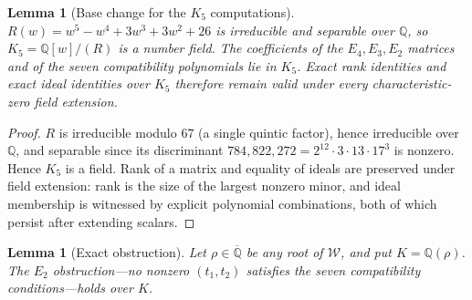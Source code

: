 \documentclass[a4paper,11pt]{article}
\theoremstyle{plain}
\newtheorem{lemma}[theorem]{Lemma}
\theoremstyle{definition}
\theoremstyle{remark}
\begin{document}
\begin{lemma}[Base change for the $K_5$ computations]\label{lem:basechange}
$R(w)=w^5-w^4+3w^3+3w^2+26$ is irreducible and separable over $\mathbb{Q}$, so $K_5=\mathbb{Q}[w]/(R)$ is a number field. The coefficients of the $E_4,E_3,E_2$ matrices and of the seven compatibility polynomials lie in $K_5$. Exact rank identities and exact ideal identities over $K_5$ therefore remain valid under every characteristic-zero field extension.
\end{lemma}

\begin{proof}
$R$ is irreducible modulo $67$ (a single quintic factor), hence irreducible over $\mathbb{Q}$, and separable since its discriminant $784{,}822{,}272=2^{12}\cdot3\cdot13\cdot17^3$ is nonzero. Hence $K_5$ is a field. Rank of a matrix and equality of ideals are preserved under field extension: rank is the size of the largest nonzero minor, and ideal membership is witnessed by explicit polynomial combinations, both of which persist after extending scalars.
\end{proof}

\begin{lemma}[Exact obstruction]\label{lem:lifting}
Let $\rho\in\overline{\mathbb{Q}}$ be any root of $\mathcal{W}$, and put $K=\mathbb{Q}(\rho)$. The $E_2$ obstruction---no nonzero $(t_1,t_2)$ satisfies the seven compatibility conditions---holds over $K$.
\end{lemma}
\end{document}
